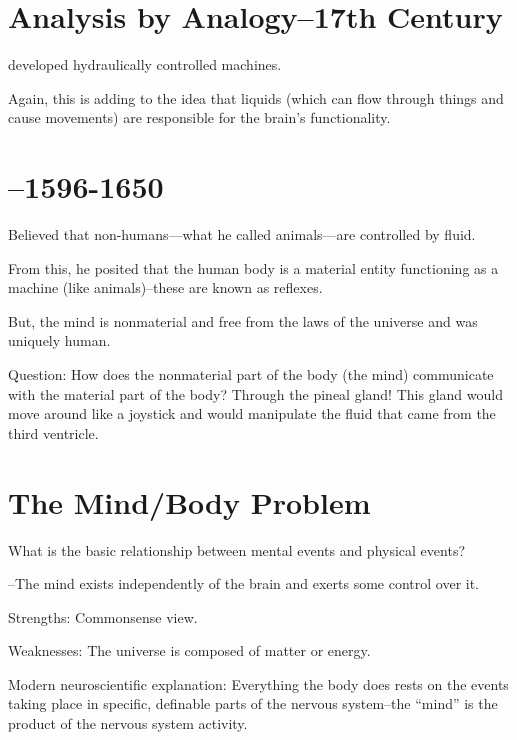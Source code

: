 \section{Analysis by Analogy--17th Century}

\begin{coloredlist}
    \item {} developed hydraulically controlled machines.
    \item Again, this is adding to the idea that liquids (which can flow through things and cause movements) are responsible for the brain's functionality.
\end{coloredlist}
\label{person:descartes}%
\section{--1596-1650}

\begin{coloredlist}
    \item Believed that non-humans---what he called animals---are controlled by fluid.
    \item From this, he posited that the human body is a material entity functioning as a machine (like animals)--these are known as reflexes.
    \item But, the mind is nonmaterial and free from the laws of the universe and was uniquely human.
    \item Question: How does the nonmaterial part of the body (the mind) communicate with the material part of the body? Through the pineal gland! This gland would move around like a joystick and would manipulate the fluid that came from the third ventricle.
\end{coloredlist}

\section{The Mind/Body Problem}

\begin{coloredlist}
    \item What is the basic relationship between mental events and physical events?
    \item {}--The mind exists independently of the brain and exerts some control over it.
    \item Strengths: Commonsense view.
    \item Weaknesses: The universe is composed of matter or energy.
    \item Modern neuroscientific explanation: Everything the body does rests on the events taking place in specific, definable parts of the nervous system--the ``mind'' is the product of the nervous system activity.
\end{coloredlist}

